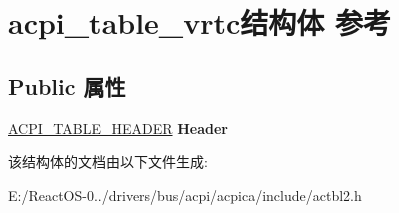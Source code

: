 \hypertarget{structacpi__table__vrtc}{}\section{acpi\+\_\+table\+\_\+vrtc结构体 参考}
\label{structacpi__table__vrtc}
\subsection*{Public 属性}
\begin{DoxyCompactItemize}
\item 
\mbox{\label{structacpi__table__vrtc_a9269355b742aa387bb9c424b5c898c94}} 
\hyperlink{structacpi__table__header}{A\+C\+P\+I\+\_\+\+T\+A\+B\+L\+E\+\_\+\+H\+E\+A\+D\+ER} {\bfseries Header}
\end{DoxyCompactItemize}


该结构体的文档由以下文件生成\+:\begin{DoxyCompactItemize}
\item 
E\+:/\+React\+O\+S-\/0../drivers/bus/acpi/acpica/include/actbl2.\+h\end{DoxyCompactItemize}
